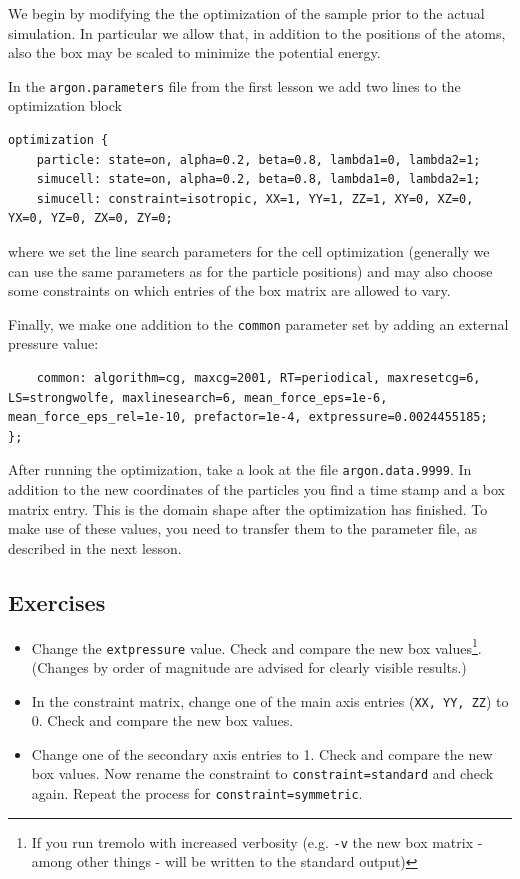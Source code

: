 We begin by modifying the the optimization of the sample prior to the actual
simulation. In particular we allow that, in addition to the positions of
the atoms, also the box may be scaled to minimize the potential energy.

In the \texttt{argon.parameters} file from the first lesson we add two lines
to the optimization block
\begin{lstlisting}
optimization {
    particle: state=on, alpha=0.2, beta=0.8, lambda1=0, lambda2=1;
    simucell: state=on, alpha=0.2, beta=0.8, lambda1=0, lambda2=1;
    simucell: constraint=isotropic, XX=1, YY=1, ZZ=1, XY=0, XZ=0, YX=0, YZ=0, ZX=0, ZY=0;
\end{lstlisting}
where we set the line search parameters for the cell optimization (generally we can use the same parameters as for the particle positions) and
may also choose some constraints on which entries of the box matrix are allowed to vary.

Finally, we make one addition to the \texttt{common} parameter set by adding an external pressure value:
\begin{lstlisting}
    common: algorithm=cg, maxcg=2001, RT=periodical, maxresetcg=6, LS=strongwolfe, maxlinesearch=6, mean_force_eps=1e-6, mean_force_eps_rel=1e-10, prefactor=1e-4, extpressure=0.0024455185;
};
\end{lstlisting}

After running the optimization, take a look at the file \texttt{argon.data.9999}. In addition to the new coordinates of the particles you find a time stamp and a box matrix entry. This is the domain shape after the optimization has finished. To make use of these values, you need to transfer them to the parameter file, as described in the next lesson.

\subsection{Exercises}
\begin{itemize}
 \item Change the \texttt{extpressure} value. Check and compare the new box values\footnote{If you run tremolo with increased verbosity (e.g. \texttt{-v} the new box matrix - among other things - will be written to the standard output)}. (Changes by order of magnitude are advised for clearly visible results.)
 \item In the constraint matrix, change one of the main axis entries (\texttt{XX, YY, ZZ}) to 0. Check and compare the new box values.
 \item Change one of the secondary axis entries to 1.
  Check and compare the new box values. Now rename the constraint to \texttt{constraint=standard} and check again.
  Repeat the process for \texttt{constraint=symmetric}.
\end{itemize}


